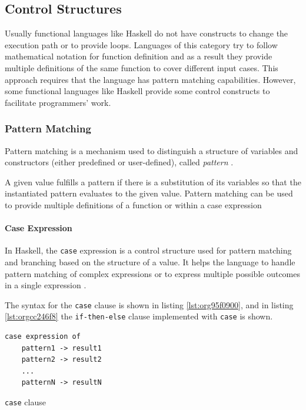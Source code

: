 \documentclass[a4paper, titlepage, twoside]{article}
\begin{document}
\subsection{Control Structures}
\label{sec:org952b4c7}

Usually functional languages like Haskell do not have constructs to change the execution path or to provide loops. Languages of this category try to follow mathematical notation for function definition and as a result they provide multiple definitions of the same function to cover different input cases. This approach requires that the language has pattern matching capabilities. However, some functional languages like Haskell provide some control constructs to facilitate programmers' work.

\subsubsection{Pattern Matching}
\label{sec:org46a8930}

Pattern matching is a mechanism used to distinguish a structure of variables and constructors (either predefined or user-defined), called \emph{pattern} \autocite[chapter 3.17]{marlowHaskell2010Language2010}.

A given value fulfills a pattern if there is a substitution of its variables so that the instantiated pattern evaluates to the given value. Pattern matching can be used to provide multiple definitions of a function or within a case expression

\paragraph*{Case Expression}
\label{sec:org1b7026e}

In Haskell, the \texttt{case} expression is a control structure used for pattern matching and branching based on the structure of a value. It helps the language to handle pattern matching of complex expressions or to express multiple possible outcomes in a single expression \autocite{kremerCPSC449Programming2015}.

The syntax for the \texttt{case} clause is shown in listing \ref{lst:org95f0900}, and in listing \ref{lst:orgcc246f8} the \texttt{if-then-else} clause implemented with \texttt{case} is shown.

\begin{listing}[htbp]
\begin{verbatim}
case expression of
    pattern1 -> result1
    pattern2 -> result2
    ...
    patternN -> resultN
\end{verbatim}
\caption{\label{lst:org95f0900}\texttt{case} clause}
\end{listing}
\end{document}
